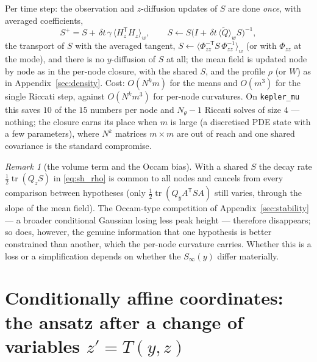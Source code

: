 \documentclass[11pt,a4paper]{article}
\newcommand{\tr}{\operatorname{tr}}
\newcommand{\T}{^{\mathsf T}}
\newcommand{\dt}{\,\delta t}
\theoremstyle{plain}
\theoremstyle{definition}
\theoremstyle{remark}
\newtheorem{remark}{Remark}
\begin{document}
Per time step: the observation and $z$-diffusion updates of $S$ are done \emph{once}, with averaged coefficients,
\[
  S^+ = S + \dt\,\gamma\,\langle H_z\T H_z\rangle_w, \qquad S \leftarrow S\big(I+\dt\,\langle\tilde Q\rangle_wS\big)^{-1},
\]
the transport of $S$ with the averaged tangent, $S\leftarrow\langle\Phi_{zz}^{-\mathsf T}S\,\Phi_{zz}^{-1}\rangle_w$ (or with $\Phi_{zz}$ at the mode), and there is no $y$-diffusion of $S$ at all; the mean field is updated node by node as in the per-node closure, with the shared $S$, and the profile $\rho$ (or $W$) as in Appendix~\ref{sec:density}. Cost: $O(N^k m)$ for the means and $O(m^3)$ for the single Riccati step, against $O(N^k m^3)$ for per-node curvatures. On \texttt{kepler\_mu} this saves $10$ of the $15$ numbers per node and $N_\theta-1$ Riccati solves of size $4$ --- nothing; the closure earns its place when $m$ is large (a discretised PDE state with a few parameters), where $N^k$ matrices $m\times m$ are out of reach and one shared covariance is the standard compromise.

\begin{remark}[the volume term and the Occam bias]
With a shared $S$ the decay rate $\tfrac12\tr(Q_zS)$ in \eqref{eq:sh_rho} is common to all nodes and cancels from every comparison between hypotheses (only $\tfrac12\tr(Q_yA\T SA)$ still varies, through the slope of the mean field). The Occam-type competition of Appendix~\ref{sec:stability} --- a broader conditional Gaussian losing less peak height --- therefore disappears; so does, however, the genuine information that one hypothesis is better constrained than another, which the per-node curvature carries. Whether this is a loss or a simplification depends on whether the $S_\infty(y)$ differ materially.
\end{remark}

\section{Conditionally affine coordinates: the ansatz after a change of variables $z'=T(y,z)$}
\label{sec:coords}
\end{document}

